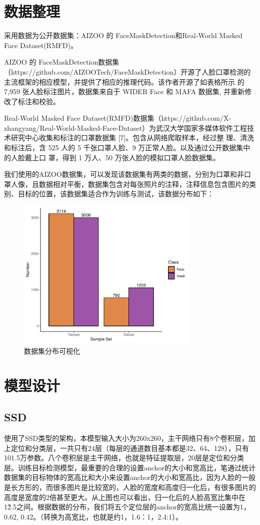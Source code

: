 \documentclass[journal,transmag]{IEEEtran}
\begin{document}
\section{数据整理}
采用数据为公开数据集：AIZOO 的 FaceMaskDetection和Real-World Masked Face Dataset(RMFD)。

AIZOO 的 FaceMaskDetection数据集（https://github.com/AIZOOTech/FaceMaskDetection）开源了人脸口罩检测的主流框架的相应模型，并提供了相应的推理代码。该作者开源了如表格所示 的 7,959 张人脸标注图片，数据集来自于 WIDER Face 和 MAFA 数据集, 并重新修改了标注和校验。

Real-World Masked Face Dataset(RMFD)数据集（https://github.com/X-zhangyang/Real-World-Masked-Face-Dataset）为武汉大学国家多媒体软件工程技术研究中心收集和标注的口罩数据集 [7]。包含从网络爬取样本，经过整 理、清洗和标注后，含 525 人的 5 千张口罩人脸、9 万正常人脸。以及通过公开数据集中的人脸戴上口 罩，得到 1 万人、50 万张人脸的模拟口罩人脸数据集。

我们使用的AIZOO数据集，可以发现该数据集有两类的数据，分别为口罩和非口罩人像，且数据相对平衡，数据集包含对每张照片的注释，注释信息包含图片的类别、目标的位置，该数据集适合作为训练与测试，该数据分布如下：
\begin{figure}[h]
\centering
\includegraphics[width=3.44in]{Dataset.pdf}
\caption{数据集分布可视化}
\end{figure}

\section{模型设计}
\subsection{SSD}
使用了SSD类型的架构，本模型输入大小为260x260，主干网络只有8个卷积层，加上定位和分类层，一共只有24层（每层的通道数目基本都是32、64、128），只有101.5万参数。八个卷积层是主干网络，也就是特征提取层，20层是定位和分类层。训练目标检测模型，最重要的合理的设置anchor的大小和宽高比，笔通过统计数据集的目标物体的宽高比和大小来设置anchor的大小和宽高比，因为人脸的一般是长方形的，而很多图片是比较宽的，人脸的宽度和高度归一化后，有很多图片的高度是宽度的2倍甚至更大。从上图也可以看出，归一化后的人脸高宽比集中在1\~2.5之间。根据数据的分布，我们将五个定位层的anchor的宽高比统一设置为1，0.62, 0.42。（转换为高宽比，也就是约1，1.6：1，2.4:1）。
\end{document}
